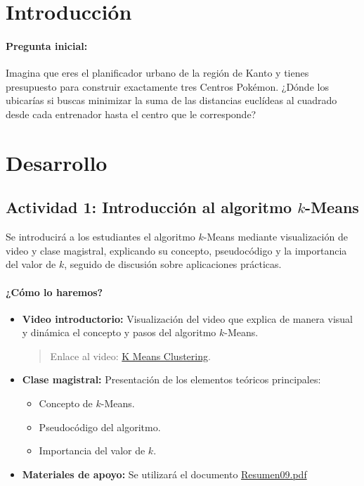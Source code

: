 \documentclass[a4,11pt]{aleph-notas}
\begin{document}
\section*{Introducción}

\paragraph{Pregunta inicial:} 
Imagina que eres el planificador urbano de la región de Kanto y tienes presupuesto para construir exactamente tres Centros Pokémon. ¿Dónde los ubicarías si buscas minimizar la suma de las distancias euclídeas al cuadrado desde cada entrenador hasta el centro que le corresponde?

\section*{Desarrollo}

\subsection*{Actividad 1: Introducción al algoritmo $k$-Means}

Se introducirá a los estudiantes el algoritmo $k$-Means mediante visualización de video y clase magistral, explicando su concepto, pseudocódigo y la importancia del valor de $k$, seguido de discusión sobre aplicaciones prácticas.

\paragraph{¿Cómo lo haremos?}  
\begin{itemize}[leftmargin=*]
    \item \textbf{Video introductorio:} 
    Visualización del video que explica de manera visual y dinámica el concepto y pasos del algoritmo $k$-Means.
    \begin{quote}
        Enlace al video: \href{https://youtu.be/2kfY0R34Dy0?si=60bbeVyyJ1g7WX63}{K Means Clustering}.
    \end{quote}
    
    \item \textbf{Clase magistral:} 
    Presentación de los elementos teóricos principales:
    \begin{itemize}
        \item Concepto de $k$-Means.
        \item Pseudocódigo del algoritmo.
        \item Importancia del valor de $k$.
    \end{itemize}
    
    \item \textbf{Materiales de apoyo:} 
    Se utilizará el documento \href{https://andres-merino.github.io/AprendizajeAutomaticoInicial-05-N0105/2-Resumenes/Resumen09.pdf}{Resumen09.pdf}
\end{itemize}
\end{document}
